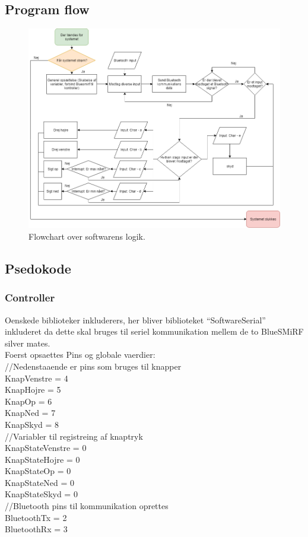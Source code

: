 \subsection{Program flow}
\begin{figure}[H]
\centering
\includegraphics[scale=0.6,angle= 90]{Billeder/ProgramFlowchart.png}
\caption{Flowchart over softwarens logik.}
\label{fig:ProgramFlow}
\end{figure}

\subsection{Psedokode}
\subsubsection{Controller}
Oenskede biblioteker inkluderers, her bliver biblioteket “SoftwareSerial” inkluderet da dette skal bruges til seriel kommunikation mellem de to BlueSMiRF silver mates.\\

Foerst opsaettes Pins og globale vaerdier:\\
	//Nedenstaaende er pins som bruges til knapper\\
	KnapVenstre = 4\\
	KnapHojre = 5\\
	KnapOp = 6\\
	KnapNed = 7\\
	KnapSkyd = 8\\
	//Variabler til registreing af knaptryk\\
	KnapStateVenstre = 0\\
	KnapStateHojre = 0\\
	KnapStateOp = 0\\
	KnapStateNed = 0\\
	KnapStateSkyd = 0\\
	//Bluetooth pins til kommunikation oprettes\\
	BluetoothTx = 2\\
	BluetoothRx = 3\\

